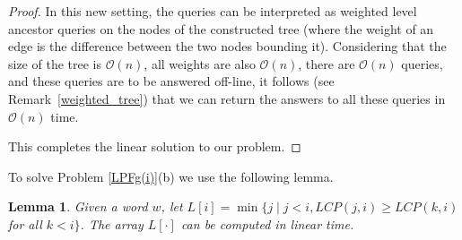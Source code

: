 \documentclass[final]{dmtcs-episciences}
\newcommand{\bigo}{{\mathcal O}}
\newcommand{\LCP}{{\mathit{LCP}}}
\newtheorem{lemma}{Lemma}
\begin{document}
\begin{proof}
In this new setting, the queries can be interpreted as weighted level ancestor queries on the nodes of the constructed tree (where the weight of an edge is the difference between the two nodes bounding it). Considering that the size of the tree is 
$\bigo(n)$, all weights are also $\bigo(n)$, there are $\bigo(n)$ queries, and these queries are to be answered off-line, it follows (see Remark~\ref{weighted_tree}) that we can return the answers to all these queries in $\bigo(n)$ time. 

This completes the linear solution to our problem. 
\end{proof}

To solve Problem \ref{LPFg(i)}(b) we use the following lemma.
\begin{lemma}\label{overlapping_LPF}
Given a word $w$, let $L[i]=\min\{j\mid j<i, \LCP(j,i)\geq \LCP(k,i)$ for all $k<i\}$. The array $L[\cdot]$ can be computed in linear time.
\end{lemma}
\end{document}
